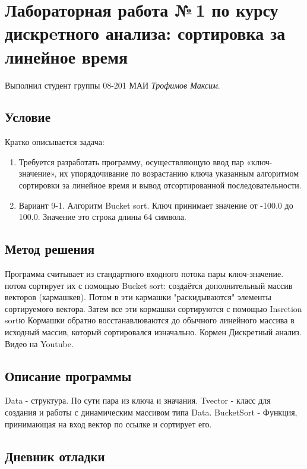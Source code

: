 \documentclass[12pt]{article}
\begin{document}
\section*{Лабораторная работа №\,1 по курсу дискрeтного анализа: сортировка за линейное время}

Выполнил студент группы 08-201 МАИ \textit{Трофимов Максим}.

\subsection*{Условие}

Кратко описывается задача: 
\begin{enumerate}
\item Требуется разработать программу, осуществляющую ввод пар 
«ключ-значение», их упорядочивание по возрастанию ключа указанным 
алгоритмом сортировки за линейное время и вывод отсортированной 
последовательности.


\item Вариант 9-1.
Алгоритм Bucket sort. 
Ключ принимает значение от -100.0 до 100.0.
Значение это строка длины 64 символа.
	
\end{enumerate}

\subsection*{Метод решения}

Программа считывает из стандартного входного потока пары ключ-значение.
потом сортирует их с помощью Bucket sort:
создаётся дополнительный массив векторов (кармашкев).
Потом в эти кармашки "раскидываются" элементы сортируемого вектора.
Затем все эти кормашки сортируются с помощью Insretion sortю
Кормашки обратно восстанавлюваются до обычного линейного массива в исходный массив, 
который сортировался изначально.
Кормен Дискретный анализ. 
Видео на Youtube.

\subsection*{Описание программы}

Data - структура. По сути пара из ключа и значания.
Tvector - класс для создания и  работы с динамическим массивом типа Data.
BucketSort - Функция, принимающая на вход вектор по ссылке и сортирует его.

\subsection*{Дневник отладки}
\end{document}
